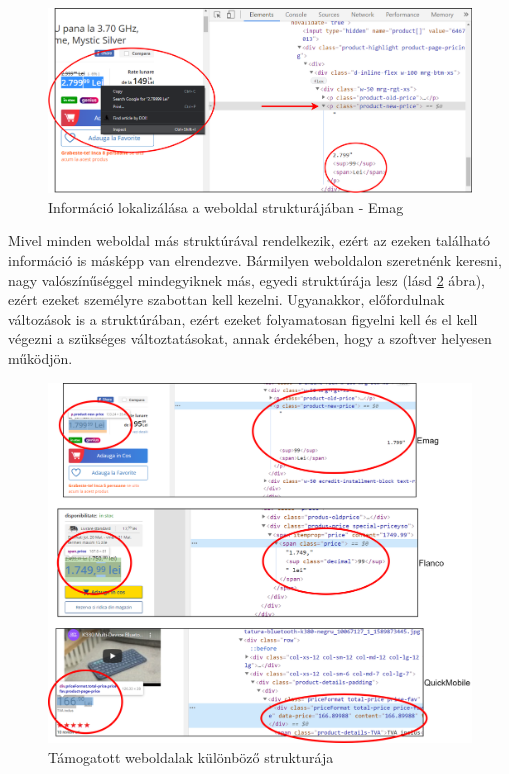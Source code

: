 \begin{figure}[H]
    \centering
    \includegraphics[scale=0.95]{figures/images/inspect_screenshot.png}
    \caption{Információ lokalizálása a weboldal strukturájában - Emag}
    \label{fig:inspect_screenshot}
\end{figure}

Mivel minden weboldal más struktúrával rendelkezik, ezért az ezeken található információ is másképp van elrendezve. Bármilyen weboldalon szeretnénk keresni, nagy valószínűséggel mindegyiknek más, egyedi struktúrája lesz (lásd \ref{fig:webshop_different_structure} ábra), ezért ezeket személyre szabottan kell kezelni. Ugyanakkor, előfordulnak változások is a struktúrában, ezért ezeket folyamatosan figyelni kell és el kell végezni a szükséges változtatásokat, annak érdekében, hogy a szoftver helyesen működjön. 

\begin{figure}[H]
    \centering
    \includegraphics[scale=0.95]{figures/images/webshop_different_structure.png}
    \caption{Támogatott weboldalak különböző strukturája}
    \label{fig:webshop_different_structure}
\end{figure}

